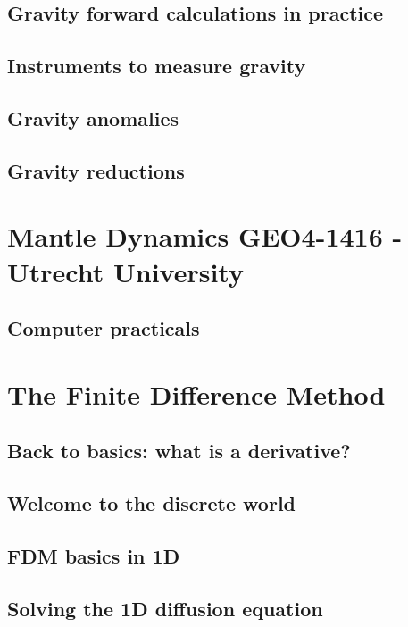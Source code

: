 \documentclass[a4paper]{article}
\numberwithin{equation}{section}
\begin{document}
\subsection{Gravity forward calculations in practice} 
\subsection{Instruments to measure gravity} 
\subsection{Gravity anomalies} 
\subsection{Gravity reductions} 

\newpage
\section{Mantle Dynamics GEO4-1416 - Utrecht University}

\subsection{Computer practicals} 


\newpage
\section{The Finite Difference Method}

\subsection{Back to basics: what is a derivative?} 
\subsection{Welcome to the discrete world} 
\subsection{FDM basics in 1D} \label{ss:fdm_basics1D}  
\subsection{Solving the 1D diffusion equation} \label{ss:fdm_diff1D} 
\end{document}
